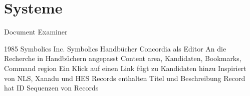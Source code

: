 \chapter{Systeme}
\label{ch:Systeme}


\begin{section}{Document Examiner}
\label{sec:DocumentExaminer}

1985
Symbolics Inc.
Symbolics Handbücher
Concordia als Editor
An die Recherche in Handbüchern angepasst
Content area, Kandidaten, Bookmarks, Command region
Ein Klick auf einen Link fügt zu Kandidaten hinzu
Inspiriert von NLS, Xanadu und HES
Records enthalten Titel und Beschreibung
Record hat ID
Sequenzen von Records

\end{section}
